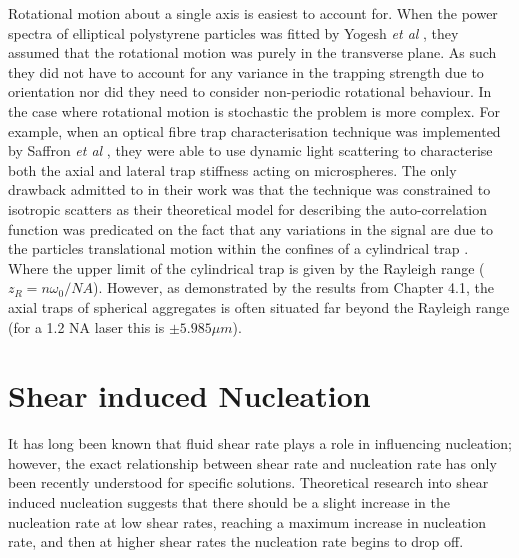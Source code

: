 Rotational motion about a single axis is easiest to account for.  
When the power spectra of elliptical polystyrene particles was 
fitted by Yogesh \textit{et al} \cite{Yogesha2011PreciseCO}, they 
assumed that the rotational motion was purely in the transverse
plane. As such they did not have to account for any variance in 
the trapping strength due to orientation nor did they need to
consider non-periodic rotational behaviour. In the case where 
rotational motion is stochastic the problem is more complex. 
For example, when an optical fibre trap characterisation 
technique was implemented by Saffron \textit{et al} 
\cite{BarZiv1997, Meller1998}, they were able to use dynamic 
light scattering to characterise both the axial and lateral 
trap stiffness acting on microspheres. The only drawback 
admitted to in their work was that the technique was constrained 
to isotropic scatters as their theoretical model for describing 
the auto-correlation function was predicated on the fact that 
any variations in the signal are due to the particles 
translational motion within the confines of a cylindrical trap 
\cite{BarZiv1997}. Where the upper limit of the cylindrical 
trap is given by the Rayleigh range ($z_R = n\omega_0/NA$).
However, as demonstrated by the results from Chapter 4.1, 
the axial traps of spherical aggregates is often situated 
far beyond the Rayleigh range (for a 1.2 NA laser this is 
$\pm5.985 \mu m$).

\section{Shear induced Nucleation}
It has long been known that fluid shear rate plays a role in 
influencing nucleation; however, the exact relationship between 
shear rate and nucleation rate has only been recently understood 
for specific solutions. Theoretical research into shear induced 
nucleation suggests that there should be a slight increase in the 
nucleation rate at low shear rates, reaching a maximum increase in 
nucleation rate, and then at higher shear rates the nucleation rate 
begins to drop off. 

